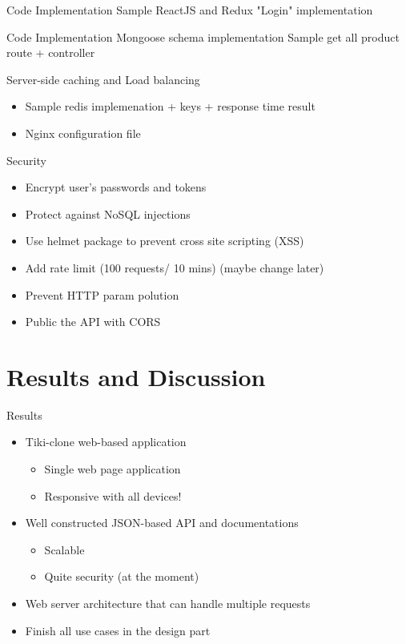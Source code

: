 \documentclass{beamer}
\begin{document}
\begin{frame}{Code Implementation}
Sample ReactJS and Redux "Login" implementation
\end{frame}

\begin{frame}{Code Implementation}
Mongoose schema implementation
Sample get all product route + controller
\end{frame}

\begin{frame}[fragile]{Server-side caching and Load balancing}
\begin{itemize}
    \item Sample redis implemenation + keys + response time result
    \item Nginx configuration file
\end{itemize}
\end{frame}

\begin{frame}[fragile]{Security}
\begin{itemize}
	\item	Encrypt user's passwords and tokens
	\item	Protect against NoSQL injections
	\item	Use helmet package to prevent cross site scripting (XSS)
	\item	Add rate limit (100 requests/ 10 mins) (maybe change later)
	\item	Prevent HTTP param polution
	\item	Public the API with CORS
	\end{itemize}
\end{frame}

\section{Results and Discussion}

\begin{frame}{Results}
	\begin{itemize}
    	\item Tiki-clone web-based application
    	\begin{itemize}
    	    \item Single web page application
    	    \item Responsive with all devices!
    	\end{itemize}
    	\pause
    	\item Well constructed JSON-based API and documentations
    	\begin{itemize}
    	    \item Scalable
    	    \item Quite security (at the moment)
    	\end{itemize}
    	\pause
        \item Web server architecture that can handle multiple requests
        \item Finish all use cases in the design part
	\end{itemize}
\end{frame}
\end{document}
